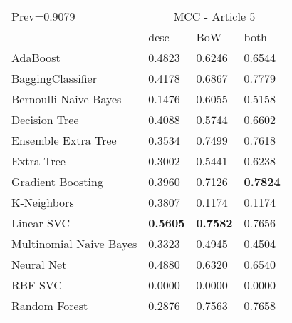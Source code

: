 \begin{tabular}{|l|l|l|l| }
\hline
Prev=0.9079 &  \multicolumn{3}{c|}{MCC - Article 5} \\
\cline{2-4} & desc & BoW & both \\ \hline
AdaBoost                & 0.4823 & 0.6246 & 0.6544\\
BaggingClassifier       & 0.4178 & 0.6867 & 0.7779\\
Bernoulli Naive Bayes   & 0.1476 & 0.6055 & 0.5158\\
Decision Tree           & 0.4088 & 0.5744 & 0.6602\\
Ensemble Extra Tree     & 0.3534 & 0.7499 & 0.7618\\
Extra Tree              & 0.3002 & 0.5441 & 0.6238\\
Gradient Boosting       & 0.3960 & 0.7126 & {\bf 0.7824}\\
K-Neighbors             & 0.3807 & 0.1174 & 0.1174\\
Linear SVC              & {\bf 0.5605} & {\bf 0.7582} & 0.7656\\
Multinomial Naive Bayes & 0.3323 & 0.4945 & 0.4504\\
Neural Net              & 0.4880 & 0.6320 & 0.6540\\
RBF SVC                 & 0.0000 & 0.0000 & 0.0000\\
Random Forest           & 0.2876 & 0.7563 & 0.7658\\
\hline
\end{tabular}